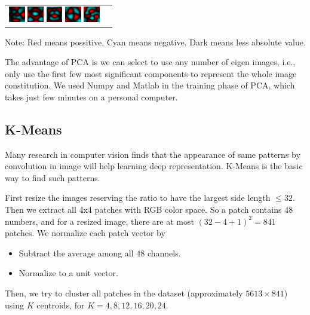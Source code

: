 \documentclass{acm_proc_article-sp}
\begin{document}
\begin{tabular}{p{1.3cm}p{6cm}}
        \includegraphics[width=20pt]{../data/PCA_visualize/eigvec12.png}
        \includegraphics[width=20pt]{../data/PCA_visualize/eigvec13.png}
        \includegraphics[width=20pt]{../data/PCA_visualize/eigvec14.png}
        \includegraphics[width=20pt]{../data/PCA_visualize/eigvec15.png}
        \includegraphics[width=20pt]{../data/PCA_visualize/eigvec16.png}
    \\
\end{tabular}

Note: Red means possitive, Cyan means negative. Dark means less absolute value.

The advantage of PCA is we can select to use any number of eigen images, i.e.,
only use the first few most significant components to represent the whole image
constitution. We used Numpy and Matlab in the training phase of PCA, which
takes just few minutes on a personal computer.

\subsection{K-Means}
Many research in computer vision finds that the appearance of same patterns
by convolution in image will help learning deep representation. K-Means is the
basic way to find such patterns.

First resize the images reserving the ratio to have the largest side length
$\leq 32$. Then we extract all 4x4 patches with RGB color space. So a patch
contains $48$ numbers, and for a resized image, there are at most
$(32-4+1)^2=841$ patches. We normalize each patch vector by
\begin{itemize}
\item Subtract the average among all 48 channels.
\item Normalize to a unit vector.
\end{itemize}
Then, we try to cluster all patches in the dataset (approximately $5613\times
841$) using $K$ centroids, for $K=4,8,12,16,20,24$.
\end{document}
